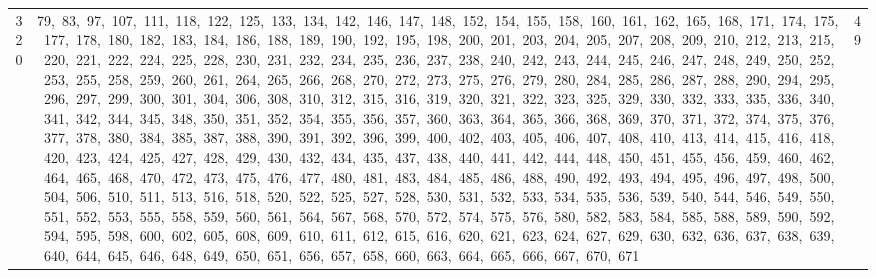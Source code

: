 \begin{longtable}{c|p{}|r}
320 & 79,\ 83,\ 97,\ 107,\ 111,\ 118,\ 122,\ 125,\ 133,\ 134,\ 142,\ 146,\ 147,\ 148,\ 152,\ 154,\ 155,\ 158,\ 160,\ 161,\ 162,\ 165,\ 168,\ 171,\ 174,\ 175,\ 177,\ 178,\ 180,\ 182,\ 183,\ 184,\ 186,\ 188,\ 189,\ 190,\ 192,\ 195,\ 198,\ 200,\ 201,\ 203,\ 204,\ 205,\ 207,\ 208,\ 209,\ 210,\ 212,\ 213,\ 215,\ 220,\ 221,\ 222,\ 224,\ 225,\ 228,\ 230,\ 231,\ 232,\ 234,\ 235,\ 236,\ 237,\ 238,\ 240,\ 242,\ 243,\ 244,\ 245,\ 246,\ 247,\ 248,\ 249,\ 250,\ 252,\ 253,\ 255,\ 258,\ 259,\ 260,\ 261,\ 264,\ 265,\ 266,\ 268,\ 270,\ 272,\ 273,\ 275,\ 276,\ 279,\ 280,\ 284,\ 285,\ 286,\ 287,\ 288,\ 290,\ 294,\ 295,\ 296,\ 297,\ 299,\ 300,\ 301,\ 304,\ 306,\ 308,\ 310,\ 312,\ 315,\ 316,\ 319,\ 320,\ 321,\ 322,\ 323,\ 325,\ 329,\ 330,\ 332,\ 333,\ 335,\ 336,\ 340,\ 341,\ 342,\ 344,\ 345,\ 348,\ 350,\ 351,\ 352,\ 354,\ 355,\ 356,\ 357,\ 360,\ 363,\ 364,\ 365,\ 366,\ 368,\ 369,\ 370,\ 371,\ 372,\ 374,\ 375,\ 376,\ 377,\ 378,\ 380,\ 384,\ 385,\ 387,\ 388,\ 390,\ 391,\ 392,\ 396,\ 399,\ 400,\ 402,\ 403,\ 405,\ 406,\ 407,\ 408,\ 410,\ 413,\ 414,\ 415,\ 416,\ 418,\ 420,\ 423,\ 424,\ 425,\ 427,\ 428,\ 429,\ 430,\ 432,\ 434,\ 435,\ 437,\ 438,\ 440,\ 441,\ 442,\ 444,\ 448,\ 450,\ 451,\ 455,\ 456,\ 459,\ 460,\ 462,\ 464,\ 465,\ 468,\ 470,\ 472,\ 473,\ 475,\ 476,\ 477,\ 480,\ 481,\ 483,\ 484,\ 485,\ 486,\ 488,\ 490,\ 492,\ 493,\ 494,\ 495,\ 496,\ 497,\ 498,\ 500,\ 504,\ 506,\ 510,\ 511,\ 513,\ 516,\ 518,\ 520,\ 522,\ 525,\ 527,\ 528,\ 530,\ 531,\ 532,\ 533,\ 534,\ 535,\ 536,\ 539,\ 540,\ 544,\ 546,\ 549,\ 550,\ 551,\ 552,\ 553,\ 555,\ 558,\ 559,\ 560,\ 561,\ 564,\ 567,\ 568,\ 570,\ 572,\ 574,\ 575,\ 576,\ 580,\ 582,\ 583,\ 584,\ 585,\ 588,\ 589,\ 590,\ 592,\ 594,\ 595,\ 598,\ 600,\ 602,\ 605,\ 608,\ 609,\ 610,\ 611,\ 612,\ 615,\ 616,\ 620,\ 621,\ 623,\ 624,\ 627,\ 629,\ 630,\ 632,\ 636,\ 637,\ 638,\ 639,\ 640,\ 644,\ 645,\ 646,\ 648,\ 649,\ 650,\ 651,\ 656,\ 657,\ 658,\ 660,\ 663,\ 664,\ 665,\ 666,\ 667,\ 670,\ 671 & 49 \\

\end{longtable}
